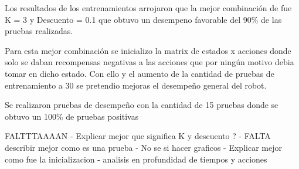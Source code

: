 Los resultados de los entrenamientos arrojaron que la mejor combinaci\'on de fue K = 3 y Descuento = 0.1 que obtuvo un desempeno favorable del 90\% de las pruebas realizadas.

Para esta mejor combinaci\'on se inicializo la matrix de estados x acciones donde solo se daban recompensas negativas a las acciones que por ning\'un motivo debia tomar en dicho estado. Con ello y el aumento de la cantidad de pruebas de entrenamiento a 30 se pretendio mejoras el desempeño general del robot. 

Se realizaron pruebas de desempeño con la cantidad de 15 pruebas donde se obtuvo un 100\% de pruebas positivas


FALTTTAAAAN
- Explicar mejor que significa K y descuento ?
- FALTA describir mejor como es una prueba
- No se si hacer graficos
- Explicar mejor como fue la inicializacion
- analisis en profundidad de tiempos y acciones

   


